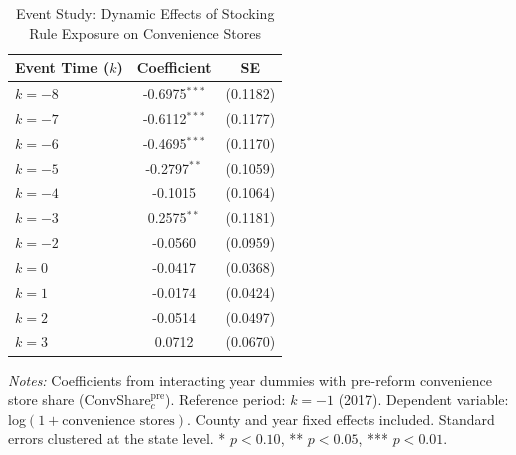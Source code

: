 
\begin{table}[H]
\centering
\caption{Event Study: Dynamic Effects of Stocking Rule Exposure on Convenience Stores}
\label{tab:event}
\begin{threeparttable}
\begin{tabular}{lcc}
\toprule
Event Time ($k$) & Coefficient & SE \\
\midrule
$k = -8$ & -0.6975$^{***}$ & (0.1182) \\
$k = -7$ & -0.6112$^{***}$ & (0.1177) \\
$k = -6$ & -0.4695$^{***}$ & (0.1170) \\
$k = -5$ & -0.2797$^{**}$ & (0.1059) \\
$k = -4$ & -0.1015 & (0.1064) \\
$k = -3$ & 0.2575$^{**}$ & (0.1181) \\
$k = -2$ & -0.0560 & (0.0959) \\
$k = 0$ & -0.0417 & (0.0368) \\
$k = 1$ & -0.0174 & (0.0424) \\
$k = 2$ & -0.0514 & (0.0497) \\
$k = 3$ & 0.0712 & (0.0670) \\
\bottomrule
\end{tabular}
\begin{tablenotes}[flushleft]
\small
\item \textit{Notes:} Coefficients from interacting year dummies with pre-reform convenience store share (ConvShare$_{c}^{\text{pre}}$). Reference period: $k = -1$ (2017). Dependent variable: log$(1 + \text{convenience stores})$. County and year fixed effects included. Standard errors clustered at the state level. * $p<0.10$, ** $p<0.05$, *** $p<0.01$.
\end{tablenotes}
\end{threeparttable}
\end{table}


